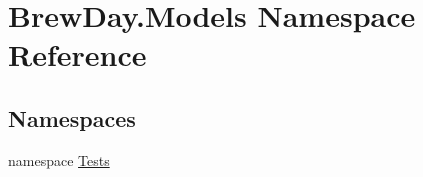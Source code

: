\hypertarget{namespace_brew_day_1_1_models}{}\section{Brew\+Day.\+Models Namespace Reference}
\label{namespace_brew_day_1_1_models}
\subsection*{Namespaces}
\begin{DoxyCompactItemize}
\item 
namespace \mbox{\hyperlink{namespace_brew_day_1_1_models_1_1_tests}{Tests}}
\end{DoxyCompactItemize}
